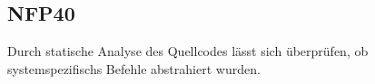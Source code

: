 \subsection*{NFP40}

Durch \gls{statische Analyse} des \Gls{Quellcode}s lässt sich überprüfen, ob \glspl{systemspezifisch} Befehle abstrahiert wurden.